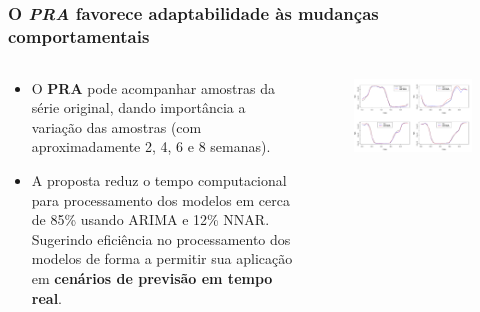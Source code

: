\documentclass[aspectratio=169]{beamer}
\begin{document}
\subsection{}
\begin{frame}
\frametitle{O \textbf{\textit{PRA}} favorece adaptabilidade às mudanças comportamentais}
\small

\begin{columns}[T] %
\begin{column}{.4\textwidth}
\begin{itemize}\footnotesize
    \item O \textbf{PRA} pode acompanhar amostras da série original, dando importância a variação das amostras (com aproximadamente 2, 4, 6 e 8 semanas).
    \item A proposta reduz o tempo computacional para processamento dos modelos em cerca de 85\% usando ARIMA e 12\% NNAR. Sugerindo eficiência no processamento dos modelos de forma a permitir sua aplicação em \textbf{cenários de previsão em tempo real}.
    
\end{itemize}
\end{column}%

\hfill%

\begin{column}{.6\textwidth}
\centering
\begin{figure}[!htb]
\centering
\includegraphics[height=0.64\textwidth,angle=0]{melhoresCiclos3_3-eps-converted-to.pdf}
\end{figure}
\end{column}%
\end{columns}

\end{frame}
\end{document}
